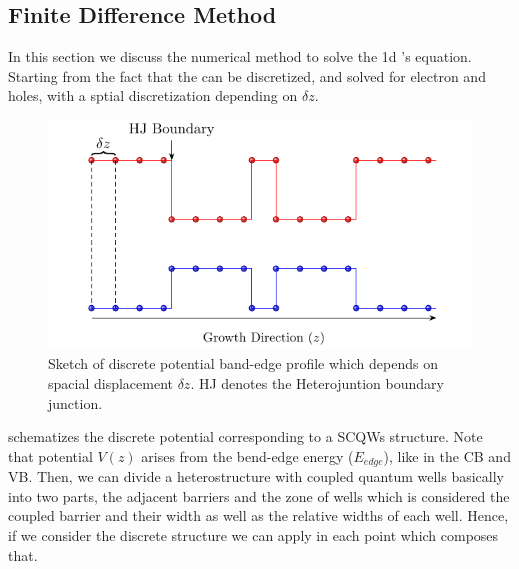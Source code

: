 \subsection{Finite Difference Method}
\label{subsec:chapter-2-finite-difference-method}
\vspace{-10mm} 
In this section we discuss the numerical method to solve the \gls{1d} \sch's equation.
Starting from the fact that the   can be discretized, and solved for electron and holes, with a sptial discretization depending on $\delta z$.
\begin{figure}[ht!]
	\centering
	\includegraphics[width=\textwidth]{../figures/chapter-2/numerical-calculations/out/fdm-potential-1}
	\caption{Sketch of discrete potential band-edge profile which depends on spacial displacement $\delta z$. HJ denotes the Heterojuntion boundary junction.}
	\label{fig:chapter-2-sec-numerical-calculations-fdm-potential}
\end{figure}
 schematizes the discrete potential corresponding to a \gls{SCQWs} structure. Note that  potential $V(z)$ arises from the bend-edge energy ($E_{edge}$), like in the \gls{CB} and \gls{VB}.
 Then, we can divide a heterostructure with coupled quantum wells basically into two parts, the adjacent barriers and the zone of wells which is considered the coupled barrier and their width as well as the relative widths of each well. Hence, if we consider the discrete structure we can apply  in each point which composes that. 

